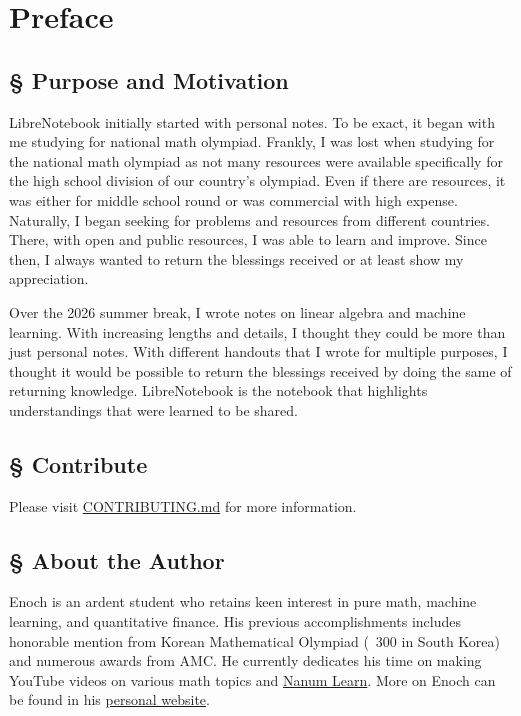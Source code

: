\documentclass[../main.tex]{subfiles}
\begin{document}
\chapter*{Preface}

\section*{\S\! Purpose and Motivation}

LibreNotebook initially started with personal notes. To be exact,
it began with me studying for national math olympiad. Frankly,
I was lost when studying for the national math olympiad as not
many resources were available specifically for the high school
division of our country's olympiad. Even if there are resources,
it was either for middle school round or was commercial with high
expense. Naturally, I began seeking for problems and resources from
different countries. There, with open and public resources, I was able
to learn and improve. Since then, I always wanted to return the
blessings received or at least show my appreciation.

Over the 2026 summer break, I wrote notes on linear algebra and
machine learning. With increasing lengths and details, I thought they
could be more than just personal notes. With different handouts that I
wrote for multiple purposes, I thought it would be possible to return
the blessings received by doing the same of returning knowledge.
LibreNotebook is the notebook that highlights understandings that were
learned to be shared.

\section*{\S\! Contribute}

Please visit \href{https://github.com/enochyu-official/LibreNotebook/blob/main/CONTRIBUTING.md}{CONTRIBUTING.md}
for more information.

\section*{\S\! About the Author}

Enoch is an ardent student who retains keen interest in pure math,
machine learning, and quantitative finance. His previous
accomplishments includes honorable mention from Korean Mathematical
Olympiad (~300 in South Korea) and numerous awards from AMC.
He currently dedicates his time on making YouTube videos on various
math topics and \href{https://nanumlearn.enochyu.com}{Nanum Learn}.
More on Enoch can be found in his
\href{https://enochyu.com}{personal website}.
\end{document}

